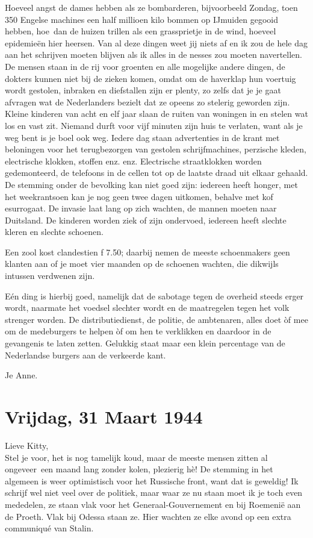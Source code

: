 \documentclass{book}
\begin{document}
Hoeveel angst de dames hebben als ze bombarderen, bijvoorbeeld Zondag,
toen 350 Engelse machines een half millioen kilo bommen op IJmuiden
gegooid hebben, hoe~dan de huizen trillen als een grassprietje in de
wind, hoeveel epidemieën hier heersen. Van al deze dingen weet jij niets
af en ik zou de hele dag aan het schrijven moeten blijven als ik alles
in de nesses zou moeten navertellen. De mensen staan in de rij voor
groenten en alle mogelijke andere dingen, de dokters kunnen niet bij de
zieken komen, omdat om de haverklap hun voertuig wordt gestolen,
inbraken en diefstallen zijn er plenty, zo zelfs dat je je gaat afvragen
wat de Nederlanders bezielt dat ze opeens zo stelerig geworden zijn.
Kleine kinderen van acht en elf jaar slaan de ruiten van woningen in en
stelen wat los en vast zit. Niemand durft voor vijf minuten zijn huis te
verlaten, want als je weg bent is je boel ook weg. Iedere dag staan
advertenties in de krant met beloningen voor het terugbezorgen van
gestolen schrijfmachines, perzische kleden, electrische klokken, stoffen
enz. enz. Electrische straatklokken worden gedemonteerd, de telefoons in
de cellen tot op de laatste draad uit elkaar gehaald. De stemming onder
de bevolking kan niet goed zijn: iedereen heeft honger, met het
weekrantsoen kan je nog geen twee dagen uitkomen, behalve met kof
esurrogaat. De invasie laat lang op zich wachten, de mannen moeten naar
Duitsland. De kinderen worden ziek of zijn ondervoed, iedereen heeft
slechte kleren en slechte schoenen.

Een zool kost clandestien ƒ 7.50; daarbij nemen de meeste schoenmakers
geen klanten aan of je moet vier maanden op de schoenen wachten, die
dikwijls intussen verdwenen zijn.

Eén ding is hierbij goed, namelijk dat de sabotage tegen de overheid
steeds erger wordt, naarmate het voedsel slechter wordt en de
maatregelen tegen het volk strenger worden. De distributiedienst, de
politie, de ambtenaren, alles doet òf mee om de medeburgers te helpen òf
om hen te verklikken en daardoor in de gevangenis te laten zetten.
Gelukkig staat maar een klein percentage van de Nederlandse burgers aan
de verkeerde kant.

Je Anne.

\chapter{Vrijdag, 31 Maart 1944}

Lieve Kitty,\\Stel je voor, het is nog tamelijk koud, maar de meeste
mensen zitten al ongeveer~een maand lang zonder kolen, plezierig hè! De
stemming in het algemeen is weer optimistisch voor het Russische front,
want dat is geweldig! Ik schrijf wel niet veel over de politiek, maar
waar ze nu staan moet ik je toch even mededelen, ze staan vlak voor het
Generaal-Gouvernement en bij Roemenië aan de Proeth. Vlak bij Odessa
staan ze. Hier wachten ze elke avond op een extra communiqué van Stalin.
\end{document}
